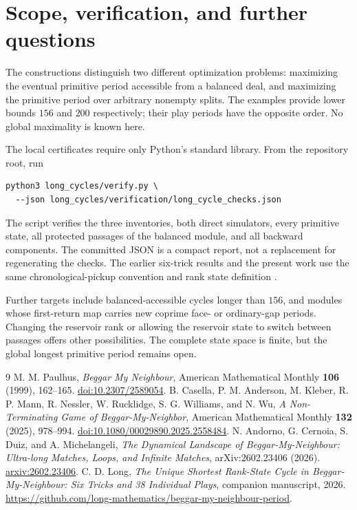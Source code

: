 \documentclass[11pt]{article}
\begin{document}
\section{Scope, verification, and further questions}
The constructions distinguish two different optimization problems:
maximizing the eventual primitive period accessible from a balanced deal,
and maximizing the primitive period over arbitrary nonempty splits. The
examples provide lower bounds $156$ and $200$ respectively; their play
periods have the opposite order. No global maximality is known here.

The local certificates require only Python's standard library. From the
repository root, run
\begin{verbatim}
python3 long_cycles/verify.py \
  --json long_cycles/verification/long_cycle_checks.json
\end{verbatim}
The script verifies the three inventories, both direct simulators, every
primitive state, all protected passages of the balanced module, and all
backward components. The committed JSON is a compact report, not a
replacement for regenerating the checks. The earlier six-trick results and
the present work use the same chronological-pickup convention and rank
state definition \cite{longshort}.

Further targets include balanced-accessible cycles longer than $156$, and
modules whose first-return map carries new coprime face- or ordinary-gap
periods. Changing the reservoir rank or allowing the reservoir state to
switch between passages offers other possibilities. The complete state
space is finite, but the global longest primitive period remains open.

\begin{thebibliography}{9}
M. M. Paulhus, \emph{Beggar My Neighbour},
American Mathematical Monthly \textbf{106} (1999), 162--165.
\href{https://doi.org/10.2307/2589054}{doi:10.2307/2589054}.
B. Casella, P. M. Anderson, M. Kleber, R. P. Mann, R. Nessler,
W. Rucklidge, S. G. Williams, and N. Wu,
\emph{A Non-Terminating Game of Beggar-My-Neighbor},
American Mathematical Monthly \textbf{132} (2025), 978--994.
\href{https://doi.org/10.1080/00029890.2025.2558484}{doi:10.1080/00029890.2025.2558484}.
\bibitem{andorno}
N. Andorno, G. Cernoia, S. Duiz, and A. Michelangeli,
\emph{The Dynamical Landscape of Beggar-My-Neighbour: Ultra-long Matches,
Loops, and Infinite Matches}, arXiv:2602.23406 (2026).
\href{https://arxiv.org/abs/2602.23406}{arxiv:2602.23406}.
C. D. Long, \emph{The Unique Shortest Rank-State Cycle in
Beggar-My-Neighbour: Six Tricks and 38 Individual Plays},
companion manuscript, 2026. \url{https://github.com/long-mathematics/beggar-my-neighbour-period}.
\end{thebibliography}
\end{document}
